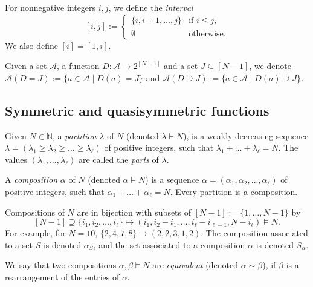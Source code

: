 \documentclass[ALCO]{cedram}
\newcommand{\NN}{\mathbb{N}}
\newcommand{\A}{\mathcal{A}}
\begin{document}
\begin{definition}
    For nonnegative integers $i,j$, we define the \emph{interval}
    \[
        [i,j] :=
        \begin{cases}
            \{i,i+1,\dots,j\} & \text{if $i \le j$,}\\
            \emptyset & \text{otherwise.}
        \end{cases}
    \]
    We also define $[i] = [1,i]$.
\end{definition}

\begin{definition}
\label{def:elements with given stat}
    Given a set $\A$, a function $D:\A \to 2^{[N-1]}$ and a set $J \subseteq [N-1]$, we denote $\A(D=J) := \{a \in \A \mid D(a) = J\}$ and $\A(D \supseteq J) := \{a \in \A \mid D(a) \supseteq J\}$.
\end{definition}

\subsection{Symmetric and quasisymmetric functions}
\label{subsec:definitions symmetric functions}

\begin{definition}
    Given $N \in \NN$, a \emph{partition} $\lambda$ of $N$ (denoted $\lambda \vdash N$), is a weakly-decreasing sequence $\lambda = (\lambda_1 \ge \lambda_2 \ge \dots \ge \lambda_\ell)$ of positive integers, such that $\lambda_1 + \dots + \lambda_\ell = N$. The values $(\lambda_1,\dots,\lambda_\ell)$ are called the \emph{parts} of $\lambda$.
    
    A \emph{composition} $\alpha$ of $N$ (denoted $\alpha \vDash N$) is a sequence $\alpha = (\alpha_1, \alpha_2, \dots, \alpha_\ell )$ of positive integers, such that $\alpha_1 + \dots + \alpha_\ell = N$. Every partition is a composition.
\end{definition}

Compositions of $N$ are in bijection with subsets of $[N-1] := \{1, \dots, N-1\}$ by 
\[
    [N-1] \supseteq \{i_1, i_2, \dots, i_\ell \} \mapsto (i_1, i_2 - i_1, \dots, i_\ell - i_{\ell-1}, N - i_\ell) \vDash N.
\]
For example, for $N = 10$, $\{2, 4, 7, 8\} \mapsto (2, 2, 3, 1, 2)$. The composition associated to a set $S$ is denoted $\alpha_S$, and the set associated to a composition $\alpha$ is denoted $S_\alpha$.

We say that two compositions $\alpha, \beta \vDash N$ are \emph{equivalent} (denoted $\alpha \sim \beta$), if $\beta$ is a rearrangement of the entries of $\alpha$.
\end{document}
